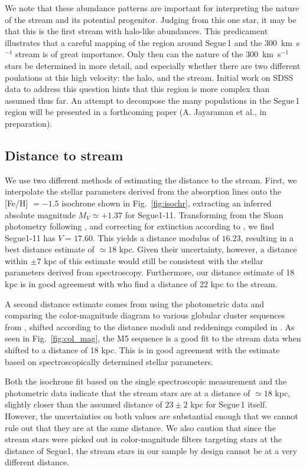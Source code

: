 \documentclass{emulateapj}
\begin{document}
We note that these abundance patterns are important for interpreting the nature of the stream and its potential progenitor. Judging from this one star, it may be that this is the first stream with halo-like abundances. This predicament illustrates that a careful mapping of the region around Segue\,1 and the 300~km~s$^{-1}$ stream is of great importance. Only then can the nature of the 300~km~s$^{-1}$ stars be determined in more detail, and especially whether there are two different poulations at this high velocity: the halo, and the stream. Initial work on SDSS data to address this question hints that this region is more complex than assumed thus far. An attempt to decompose the many populations in the Segue\,1 region will be presented in a forthcoming paper (A. Jayaraman et al., in preparation).



\subsection{Distance to stream}

We use two different methods of estimating the distance to the stream. First, we interpolate the stellar parameters derived from the absorption lines onto the [Fe/H] $= -1.5$ isochrone shown in Fig.~\ref{fig:isochr}, extracting an inferred absolute magnitude $M_V \simeq +1.37$ for Segue1-11. Transforming from the Sloan photometry following \citet{Jordi2006}, and correcting for extinction according to \citet{Schlegel1998}, we find Segue1-11 has $V = 17.60$. This yields a distance modulus of $16.23$, resulting in a best distance estimate of $\simeq 18$ kpc. Given their uncertainty, however, a distance within $\pm 7$ kpc of this estimate would still be consistent with the stellar parameters derived from spectroscopy. Furthermore, our distance estimate of 18 kpc is in good agreement with \citet{Simon2011} who find a distance of 22 kpc to the stream.


A second distance estimate comes from using the photometric data and comparing the color-magnitude diagram to various globular cluster sequences from \citet{An2008}, shifted according to the distance moduli and reddenings compiled in \citet{Harris1996}. As seen in Fig.~\ref{fig:col_mag}, the M5 sequence is a good fit to the stream data when shifted to a distance of 18 kpc. This is in good agreement with the estimate based on spectroscopically determined stellar parameters.

Both the isochrone fit based on the single spectroscopic measurement and the photometric data indicate that the stream stars are at a distance of $\simeq 18$ kpc, slightly closer than the assumed distance of $23 \pm 2$ kpc \citep{Belokurov2007} for Segue\,1 itself. However, the uncertainties on both values are substantial enough that we cannot rule out that they are at the same distance. We also caution that since the stream stars were picked out in color-magnitude filters targeting stars at the distance of Segue1, the stream stars in our sample by design cannot be at a very different distance. 
\end{document}
